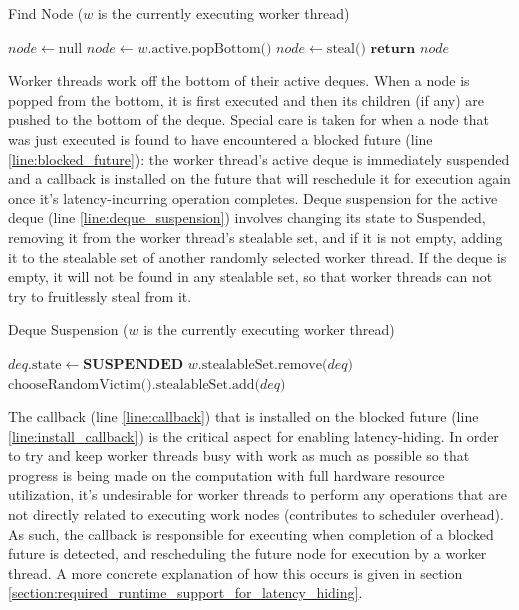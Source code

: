\documentclass[bsc,frontabs,singlespacing,parskip,deptreport,normalheadings]{infthesis}
\begin{document}
\begin{algorithm}
\caption{Find Node ($w$ is the currently executing worker thread)}
\label{alg:find_node}
\begin{algorithmic}[1]
        \State $node \gets \text{null}$
            \State $node \gets w \text{.active.popBottom()}$
        \EndIf
         \label{line:no_work}
            \State $node \gets \text{steal()}$
        \EndIf
        \State $\textbf{return } node$
    \EndFunction
\end{algorithmic}
\end{algorithm}

Worker threads work off the bottom of their active deques. When a node is popped
from the bottom, it is first executed and then its children (if any) are pushed
to the bottom of the deque. Special care is taken for when a node that was just
executed is found to have encountered a blocked future (line
\ref{line:blocked_future}): the worker thread's active deque is immediately
suspended and a callback is installed on the future that will reschedule it for
execution again once it's latency-incurring operation completes. Deque
suspension for the active deque (line \ref{line:deque_suspension}) involves
changing its state to Suspended, removing it from the worker thread's stealable
set, and if it is not empty, adding it to the stealable set of another randomly
selected worker thread. If the deque is empty, it will not be found in any
stealable set, so that worker threads can not try to fruitlessly steal from it. 

\begin{algorithm}
\caption{Deque Suspension ($w$ is the currently executing worker thread)}
\label{alg:suspend_and_find}
\begin{algorithmic}[1]
     \label{line:deque_suspension}
        \State $deq\text{.state} \gets \textbf{SUSPENDED}$
        \State $ w \text{.stealableSet.remove(} deq \text{)}$
            \State $ \text{chooseRandomVictim().stealableSet.add(} deq \text{)}$
        \EndIf
    \EndFunction
\end{algorithmic}
\end{algorithm}

The callback (line \ref{line:callback}) that is installed on the blocked future
(line \ref{line:install_callback}) is the critical aspect for enabling
latency-hiding. In order to try and keep worker threads busy with work as much
as possible so that progress is being made on the computation with full hardware
resource utilization, it's undesirable for worker threads to perform any
operations that are not directly related to executing work nodes (contributes to
scheduler overhead). As such, the callback is responsible for executing when
completion of a blocked future is detected, and rescheduling the future node for
execution by a worker thread. A more concrete explanation of how this occurs is
given in section \ref{section:required_runtime_support_for_latency_hiding}.
\end{document}
